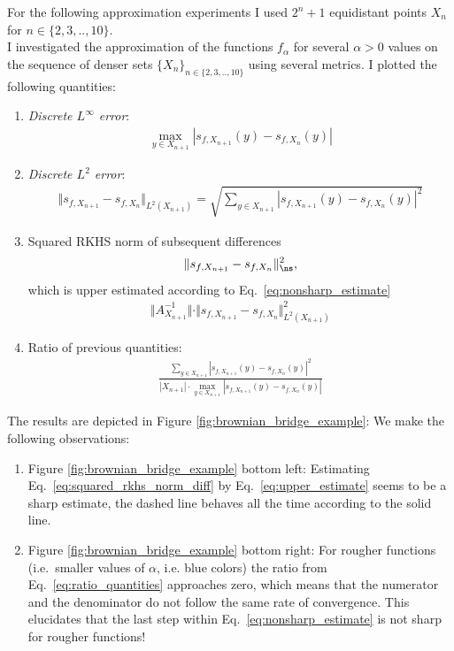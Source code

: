 \documentclass[a4paper, 10pt]{article}
\begin{document}
\noindent For the following approximation experiments I used $2^n + 1$ equidistant points $X_n$ for $n \in \{2, 3, .., 10\}$. \\
I investigated the approximation of the functions $f_\alpha$ for several $\alpha > 0$ values on the sequence of denser sets $\{ X_n \}_{n \in \{2, 3, .., 10\}}$ using several metrics.
I plotted the following quantities:
\begin{enumerate}
\item \textit{Discrete $L^\infty$ error}:
\begin{align}
\label{eq:discrete_Linfty_error}
\max_{y \in X_{n+1}} | s_{f,X_{n+1}}(y) - s_{f,X_n}(y) |
\end{align}
\item \textit{Discrete $L^2$ error}:
\begin{align}
\label{eq:discrete_L2_error}
\Vert s_{f, X_{n+1}} - s_{f, X_n} \Vert_{L^2(X_{n+1})} = \sqrt{\sum_{y \in X_{n+1}} | s_{f,X_{n+1}}(y) - s_{f,X_n}(y) |^2}
\end{align}
\item 
Squared RKHS norm of subsequent differences
\begin{align}
\label{eq:squared_rkhs_norm_diff}
\Vert s_{f, X_{n+1}} - s_{f, X_n} \Vert_{\ns}^2,
\end{align}
which is upper estimated according to Eq.\ \eqref{eq:nonsharp_estimate}
\begin{align}
\label{eq:upper_estimate}
\Vert A_{X_{n+1}}^{-1} \Vert \cdot \Vert s_{f, X_{n+1}} - s_{f, X_n} \Vert_{L^2(X_{n+1})}^2
\end{align}

\item Ratio of previous quantities:
\begin{align}
\label{eq:ratio_quantities}
\frac{\sum_{y \in X_{n+1}} | s_{f,X_{n+1}}(y) - s_{f,X_n}(y) |^2}{|X_{n+1}| \cdot \max_{y \in X_{n+1}} | s_{f,X_{n+1}}(y) - s_{f,X_n}(y) |} 
%
\end{align}
\end{enumerate}
The results are depicted in Figure \ref{fig:brownian_bridge_example}: 
We make the following observations:
\begin{enumerate}
\item Figure \ref{fig:brownian_bridge_example} bottom left:
Estimating Eq.\ \eqref{eq:squared_rkhs_norm_diff} by Eq.\ \eqref{eq:upper_estimate} seems to be a sharp estimate, the dashed line behaves all the time according to the solid line.
\item Figure \ref{fig:brownian_bridge_example} bottom right:
For rougher functions (i.e.\ smaller values of $\alpha$, i.e. blue colors) the ratio from Eq.\ \eqref{eq:ratio_quantities} approaches zero, which means that the numerator and the denominator do not follow the same rate of convergence.
This elucidates that the last step within Eq.\ \eqref{eq:nonsharp_estimate} is not sharp for rougher functions!
\end{enumerate}
\end{document}
